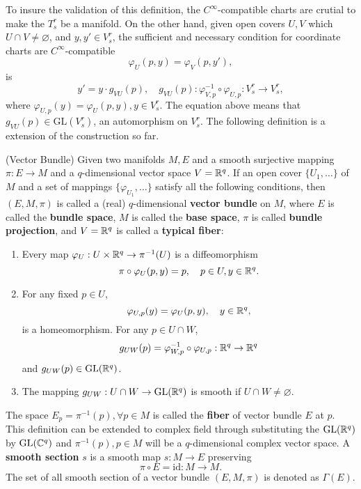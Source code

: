 To insure the validation of this definition, the $C^\infty$-compatible charts are crutial to make the $T^r_s$ be a manifold. On the other hand, given open covers $U,V$ which $U\cap V\ne \varnothing$, and $y,y'\in V^r_s$, the sufficient and necessary condition for coordinate charts are $C^\infty$-compatible 
\begin{equation}
\varphi_U(p,y)=\varphi_V(p,y'),
\end{equation}
is
\begin{equation}
y'=y\cdot g_{VU}(p),\quad g_{VU}(p):\varphi^{-1}_{V,p}\circ\varphi_{U,p}:V^r_s\to V^r_s,
\end{equation}
where $\varphi_{U,p}(y) = \varphi_{U}(p,y),y\in V^r_s$. The equation above means that $g_{VU}(p)\in \text{GL}(V^r_s)$, an automorphism on $V^r_s$. The following definition is a extension of the construction so far.


\begin{definition}(Vector Bundle)
Given two manifolds $M, E$ and a smooth surjective mapping $\pi:E\to M$ and a $q$-dimensional vector space $V=\mathbb{R}^q$. If an open cover $\{U_1,\dots\}$ of $M$ and a set of mappings $\{\varphi_{U_1},\dots\}$ satisfy all the following conditions, then $(E,M,\pi)$ is called a (real) $q$-dimensional \textbf{vector bundle} on $M$, where $E$ is called the \textbf{bundle space}, $M$ is called the \textbf{base space}, $\pi$ is called \textbf{bundle projection}, and $V=\mathbb{R}^q$ is called a \textbf{typical fiber}:
\begin{enumerate}
\item Every map $\varphi_U:U\times \mathbb{R}^q\to\pi^{-1}(U)$ is a diffeomorphism
\begin{equation}
\pi\circ\varphi_U(p,y)=p,\quad p\in U,y\in\mathbb{R}^q.
\end{equation}
\item For any fixed $p\in U$,\
\begin{equation}
\varphi_{U,p}(y)=\varphi_U(p,y),\quad y\in\mathbb{R}^q,
\end{equation}
is a homeomorphism. For any $p\in U\cap W$,
\begin{equation}
g_{UW}(p)=\varphi_{W,p}^{-1}\circ\varphi_{U,p}:\mathbb{R}^q\to\mathbb{R}^q
\end{equation}
and $g_{UW}(p)\in \text{GL}(\mathbb{R}^q)$.
\item The mapping $g_{UW}:U\cap W\to \text{GL}(\mathbb{R}^q)$ is smooth if $U\cap W\ne\varnothing$.
\end{enumerate}
The space $E_p=\pi^{-1}(p),\forall p\in M$ is called the \textbf{fiber} of vector bundle $E$ at $p$.
This definition can be extended to complex field through substituting the $\text{GL}(\mathbb{R}^q)$ by $\text{GL}(\mathbb{C}^q)$ and $\pi^{-1}(p),p\in M$ will be a $q$-dimensional complex vector space.  A \textbf{smooth section} $s$ is a smooth map $s:M\to E$ preserving
\begin{equation}
\pi\circ E=\text{id}:M\to M.
\end{equation}
The set of all smooth section of a vector bundle $(E,M,\pi)$ is denoted as $\Gamma(E)$.
\end{definition}

